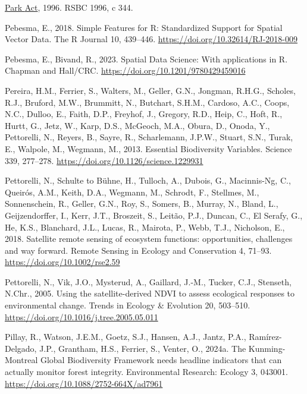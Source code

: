 \documentclass[
]{agujournal2019}
\newlength{\cslhangindent}
\newenvironment{CSLReferences}[2] %
 {\begin{list}{}{%
  \setlength{\itemindent}{0pt}
  \setlength{\leftmargin}{0pt}
  \setlength{\parsep}{0pt}
  \ifodd #1
   \setlength{\leftmargin}{\cslhangindent}
   \setlength{\itemindent}{-1\cslhangindent}
  \fi
  \setlength{\itemsep}{#2\baselineskip}}}
 {\end{list}}
\begin{document}
\begin{CSLReferences}{1}{0}
\href{https://www.bclaws.gov.bc.ca/civix/document/id/complete/statreg/96344_01}{Park
{Act}}, 1996. RSBC 1996, c 344.

Pebesma, E., 2018. {Simple Features for R: Standardized Support for
Spatial Vector Data}. {The R Journal} 10, 439--446.
\url{https://doi.org/10.32614/RJ-2018-009}

Pebesma, E., Bivand, R., 2023. {Spatial Data Science: With applications
in R}. {Chapman and Hall/CRC}.
\url{https://doi.org/10.1201/9780429459016}

Pereira, H.M., Ferrier, S., Walters, M., Geller, G.N., Jongman, R.H.G.,
Scholes, R.J., Bruford, M.W., Brummitt, N., Butchart, S.H.M., Cardoso,
A.C., Coops, N.C., Dulloo, E., Faith, D.P., Freyhof, J., Gregory, R.D.,
Heip, C., Hoft, R., Hurtt, G., Jetz, W., Karp, D.S., McGeoch, M.A.,
Obura, D., Onoda, Y., Pettorelli, N., Reyers, B., Sayre, R.,
Scharlemann, J.P.W., Stuart, S.N., Turak, E., Walpole, M., Wegmann, M.,
2013. Essential Biodiversity Variables. Science 339, 277--278.
\url{https://doi.org/10.1126/science.1229931}

Pettorelli, N., Schulte to Bühne, H., Tulloch, A., Dubois, G.,
Macinnis-Ng, C., Queirós, A.M., Keith, D.A., Wegmann, M., Schrodt, F.,
Stellmes, M., Sonnenschein, R., Geller, G.N., Roy, S., Somers, B.,
Murray, N., Bland, L., Geijzendorffer, I., Kerr, J.T., Broszeit, S.,
Leitão, P.J., Duncan, C., El Serafy, G., He, K.S., Blanchard, J.L.,
Lucas, R., Mairota, P., Webb, T.J., Nicholson, E., 2018. Satellite
remote sensing of ecosystem functions: opportunities, challenges and way
forward. Remote Sensing in Ecology and Conservation 4, 71--93.
\url{https://doi.org/10.1002/rse2.59}

Pettorelli, N., Vik, J.O., Mysterud, A., Gaillard, J.-M., Tucker, C.J.,
Stenseth, N.Chr., 2005. Using the satellite-derived NDVI to assess
ecological responses to environmental change. Trends in Ecology \&
Evolution 20, 503--510. \url{https://doi.org/10.1016/j.tree.2005.05.011}

Pillay, R., Watson, J.E.M., Goetz, S.J., Hansen, A.J., Jantz, P.A.,
Ramírez-Delgado, J.P., Grantham, H.S., Ferrier, S., Venter, O., 2024a.
The Kunming-Montreal Global Biodiversity Framework needs headline
indicators that can actually monitor forest integrity. Environmental
Research: Ecology 3, 043001.
\url{https://doi.org/10.1088/2752-664X/ad7961}


\end{CSLReferences}
\end{document}
